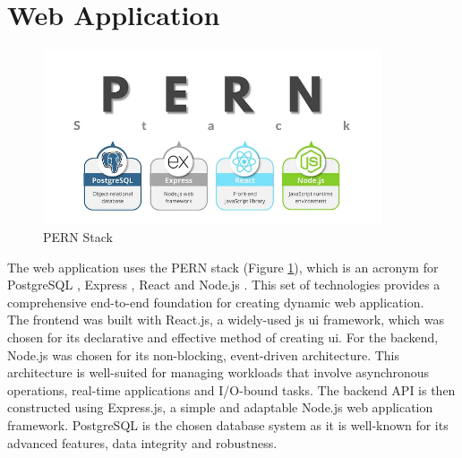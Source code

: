 \section{Web Application}
\begin{figure}[h!]
    \centering
    \includegraphics[width=10cm]{Images/pern.png}
    \caption{PERN Stack \citep{alves_2023_get}}
    \label{fig:pern}
\end{figure}
The web application uses the PERN stack (Figure \ref{fig:pern}), which is an acronym for PostgreSQL \citep{thepostgresqlglobaldevelopmentgroup_2019_postgresql}, Express \citep{openjsfoundation_2017_express}, React \citep{metaopensource_2024_react} and Node.js \citep{nodejs_2023_nodejs}.
This set of technologies provides a comprehensive end-to-end foundation for creating dynamic web application.
\\
\indent The frontend was built with React.js, a widely-used \gls{js} \gls{ui} framework, which was chosen for its declarative and effective method of creating \gls{ui}.
For the backend, Node.js was chosen for its non-blocking, event-driven architecture.
This architecture is well-suited for managing workloads that involve asynchronous operations, real-time applications and I/O-bound tasks.
The backend API is then constructed using Express.js, a simple and adaptable Node.js web application framework.
PostgreSQL is the chosen database system as it is well-known for its advanced features, data integrity and robustness.
